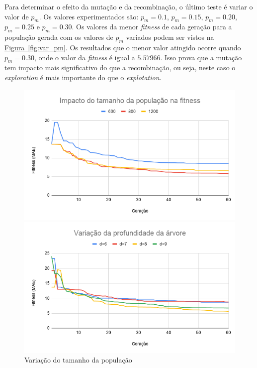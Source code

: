 \documentclass[a4paper]{article}
\begin{document}
Para determinar o efeito da mutação e da recombinação, o último teste é variar o
valor de $p_m$. Os valores experimentados são: $p_m=0.1$, $p_m=0.15$,
$p_m=0.20$, $p_m=0.25$ e $p_m=0.30$. Os valores da menor \textit{fitness} de
cada geração para a população gerada com os valores de $p_m$ variados podem ser
vistos na \hyperref[fig:var_pm]{Figura~\ref*{fig:var_pm}}. Os resultados que o
menor valor atingido ocorre quando $p_m=0.30$, onde o valor da \textit{fitness}
é igual a $5.57966$. Isso prova que a mutação tem impacto mais significativo do
que a recombinação, ou seja, neste caso o \textit{exploration} é mais importante
do que o \textit{explotation}.

\begin{figure}[h!]
  \begin{minipage}{0.5\textwidth}
    \includegraphics[width=\textwidth]{var_pop}
    \caption{Variação do tamanho da população}
    \label{fig:var_pop}
  \end{minipage}
  \begin{minipage}{0.5\textwidth}
    \includegraphics[width=\textwidth]{var_d}

\end{minipage}
\end{figure}
\end{document}
